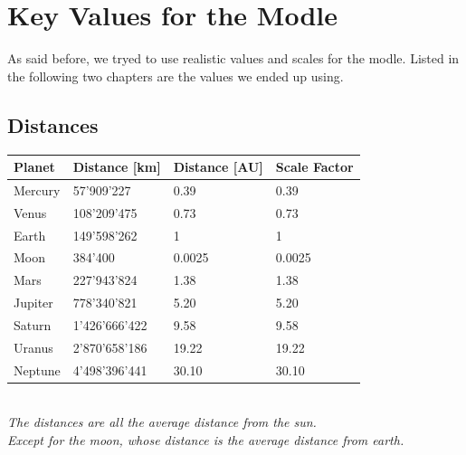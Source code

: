 \pagebreak
\section{Key Values for the Modle}
As said before, we tryed to use realistic values and scales for the modle. Listed in the following two chapters are the values we ended up using.

\subsection{Distances}
\begin{center}
    \begin{tabular}{| l | l | l | l |}
    \hline
    Planet & Distance [km] & Distance [AU] & Scale Factor \\ \hline
    Mercury & 57'909'227 & 0.39 & 0.39 \\ \hline
    Venus & 108'209'475 & 0.73 & 0.73 \\ \hline
    Earth & 149'598'262 & 1 & 1 \\ \hline
    Moon & 384'400 & 0.0025 & 0.0025 \\ \hline
    Mars & 227'943'824 & 1.38 & 1.38 \\ \hline
    Jupiter & 778'340'821 & 5.20 & 5.20 \\ \hline
    Saturn & 1'426'666'422 & 9.58 & 9.58 \\ \hline
    Uranus & 2'870'658'186 & 19.22 & 19.22 \\ \hline
    Neptune & 4'498'396'441 & 30.10 & 30.10 \\
    \hline
    \end{tabular}\\
    \textit{The distances are all the average distance from the sun.\\
    Except for the moon, whose distance is the average distance from earth.}
\end{center}


